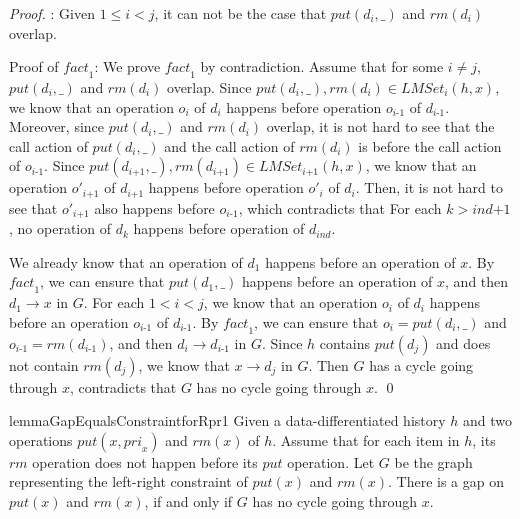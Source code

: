 \documentclass{llncs}
\begin{document}
\begin {proof}
: Given $1 \leq i < j$, it can not be the case that $\textit{put}(d_i,\_)$ and $\textit{rm}(d_i)$ overlap.

Proof of $\textit{fact}_1$: We prove $\textit{fact}_1$ by contradiction. Assume that for some $i \neq j$, $\textit{put}(d_i,\_)$ and $\textit{rm}(d_i)$ overlap. Since $\textit{put}(d_i,\_), \textit{rm}(d_i) \in \textit{LMSet}_i(h,x)$, we know that an operation $o_i$ of $d_i$ happens before operation $o_{\textit{i-1}}$ of $d_{\textit{i-1}}$. Moreover, since $\textit{put}(d_i,\_)$ and $\textit{rm}(d_i)$ overlap, it is not hard to see that the call action of $\textit{put}(d_i,\_)$ and the call action of $\textit{rm}(d_i)$ is before the call action of $o_{\textit{i-1}}$. Since $\textit{put}(d_{\textit{i+1}},\_), \textit{rm}(d_{\textit{i+1}}) \in \textit{LMSet}_{\textit{i+1}}(h,x)$, we know that an operation $o'_{\textit{i+1}}$ of $d_{\textit{i+1}}$ happens before operation $o'_i$ of $d_i$. Then, it is not hard to see that $o'_{\textit{i+1}}$ also happens before $o_{\textit{i-1}}$, which contradicts that For each $k > \textit{ind+1}$, no operation of $d_k$ happens before operation of $d_{\textit{ind}}$.

We already know that an operation of $d_1$ happens before an operation of $x$. By $\textit{fact}_1$, we can ensure that $\textit{put}(d_1,\_)$ happens before an operation of $x$, and then $d_1 \rightarrow x$ in $G$. For each $1 < i < j$, we know that an operation $o_i$ of $d_i$ happens before an operation $o_{\textit{i-1}}$ of $d_{\textit{i-1}}$. By $\textit{fact}_1$, we can ensure that $o_i=\textit{put}(d_i,\_)$ and $o_{\textit{i-1}}=\textit{rm}(d_{\textit{i-1}})$, and then $d_i \rightarrow d_{\textit{i-1}}$ in $G$. Since $h$ contains $\textit{put}(d_j)$ and does not contain $\textit{rm}(d_j)$, we know that $x \rightarrow d_j$ in $G$. Then $G$ has a cycle going through $x$, contradicts that $G$ has no cycle going through $x$. \qed
\end {proof}



\begin{restatable}{lemma}{GapEqualsConstraintforRpr1}
\label{lemma:Gap Equals Constraint for Rpr1}
Given a data-differentiated history $h$ and two operations $\textit{put}(x,\textit{pri}_x)$ and $\textit{rm}(x)$ of $h$. %
Assume that for each item in $h$, its $\textit{rm}$ operation does not happen before its $\textit{put}$ operation. Let $G$ be the graph representing the left-right constraint of $\textit{put}(x)$ and $\textit{rm}(x)$. There is a gap on $\textit{put}(x)$ and $\textit{rm}(x)$, if and only if $G$ has no cycle going through $x$.
\end{restatable}
\end{document}
